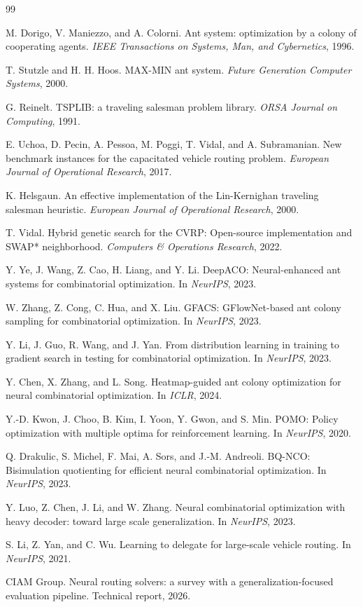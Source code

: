 \documentclass[11pt]{article}
\begin{document}
\begin{thebibliography}{99}

M. Dorigo, V. Maniezzo, and A. Colorni.
Ant system: optimization by a colony of cooperating agents.
\emph{IEEE Transactions on Systems, Man, and Cybernetics}, 1996.

T. Stutzle and H. H. Hoos.
MAX-MIN ant system.
\emph{Future Generation Computer Systems}, 2000.

G. Reinelt.
TSPLIB: a traveling salesman problem library.
\emph{ORSA Journal on Computing}, 1991.

E. Uchoa, D. Pecin, A. Pessoa, M. Poggi, T. Vidal, and A. Subramanian.
New benchmark instances for the capacitated vehicle routing problem.
\emph{European Journal of Operational Research}, 2017.

K. Helsgaun.
An effective implementation of the Lin-Kernighan traveling salesman heuristic.
\emph{European Journal of Operational Research}, 2000.

T. Vidal.
Hybrid genetic search for the CVRP: Open-source implementation and SWAP* neighborhood.
\emph{Computers \& Operations Research}, 2022.

Y. Ye, J. Wang, Z. Cao, H. Liang, and Y. Li.
DeepACO: Neural-enhanced ant systems for combinatorial optimization.
In \emph{NeurIPS}, 2023.

W. Zhang, Z. Cong, C. Hua, and X. Liu.
GFACS: GFlowNet-based ant colony sampling for combinatorial optimization.
In \emph{NeurIPS}, 2023.

Y. Li, J. Guo, R. Wang, and J. Yan.
From distribution learning in training to gradient search in testing for combinatorial optimization.
In \emph{NeurIPS}, 2023.

Y. Chen, X. Zhang, and L. Song.
Heatmap-guided ant colony optimization for neural combinatorial optimization.
In \emph{ICLR}, 2024.

Y.-D. Kwon, J. Choo, B. Kim, I. Yoon, Y. Gwon, and S. Min.
POMO: Policy optimization with multiple optima for reinforcement learning.
In \emph{NeurIPS}, 2020.

Q. Drakulic, S. Michel, F. Mai, A. Sors, and J.-M. Andreoli.
BQ-NCO: Bisimulation quotienting for efficient neural combinatorial optimization.
In \emph{NeurIPS}, 2023.

Y. Luo, Z. Chen, J. Li, and W. Zhang.
Neural combinatorial optimization with heavy decoder: toward large scale generalization.
In \emph{NeurIPS}, 2023.

S. Li, Z. Yan, and C. Wu.
Learning to delegate for large-scale vehicle routing.
In \emph{NeurIPS}, 2021.

CIAM Group.
Neural routing solvers: a survey with a generalization-focused evaluation pipeline.
Technical report, 2026.

\end{thebibliography}
\end{document}
